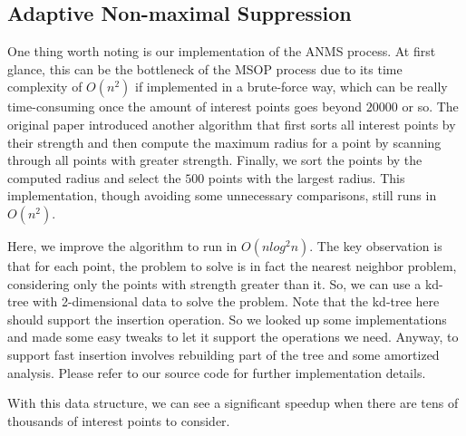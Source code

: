\documentclass[a4paper]{article}
\begin{document}
\subsection{Adaptive Non-maximal Suppression}
One thing worth noting is our implementation of the ANMS process. At first glance,
this can be the bottleneck of the MSOP process due to its time complexity of $O(n^2)$
if implemented in a brute-force way, which can be really time-consuming once the
amount of interest points goes beyond $20000$ or so. The original paper introduced
another algorithm that first sorts all interest points by their strength and
then compute the maximum radius for a point by scanning through all points with
greater strength. Finally, we sort the points by the computed radius and select
the $500$ points with the largest radius.  This implementation, though avoiding
some unnecessary comparisons, still runs in $O(n^2)$.

Here, we improve the algorithm to run in $O(nlog^2n)$. The key observation is that
for each point, the problem to solve is in fact the nearest neighbor problem,
considering only the points with strength greater than it. So, we can use a kd-tree
with 2-dimensional data to solve the problem. Note that the kd-tree here should
support the insertion operation. So we looked up some implementations and made some
easy tweaks to let it support the operations we need. Anyway, to support fast insertion
involves rebuilding part of the tree and some amortized analysis. Please refer
to our source code for further implementation details.

With this data structure, we can see a significant speedup when there are tens of
thousands of interest points to consider.
\end{document}
